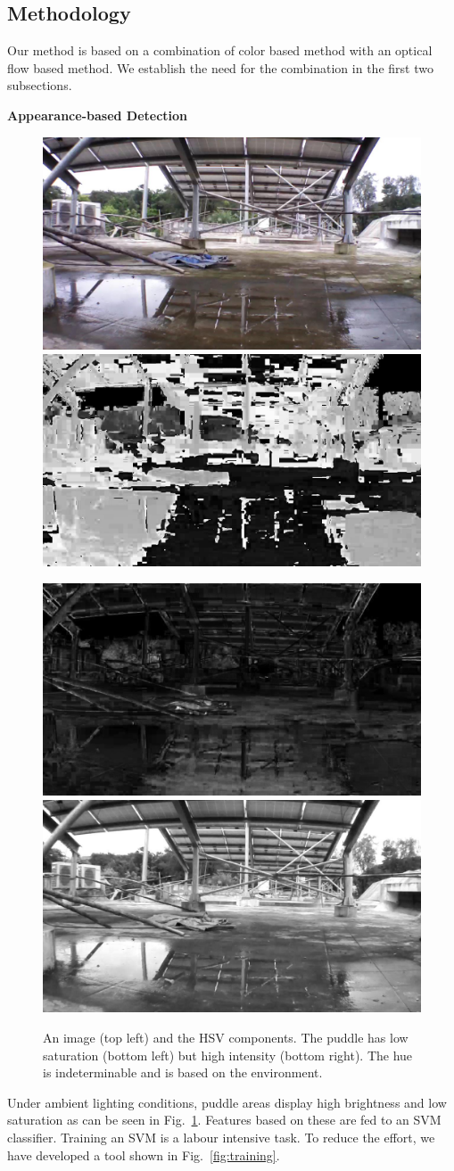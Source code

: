 \documentclass[11pt]{article}
\begin{document}
\subsection{Methodology}
Our method is based on a combination of color based method with an optical flow
based method.  We establish the need for the combination in the first two subsections.

\noindent\textbf{Appearance-based Detection}

\begin{figure}[h!]
  \centering
  \includegraphics[width=0.4\linewidth]{stagnantWater/figures/IMG_PAIR_27_1}
  \hfill
  \includegraphics[width=0.4\linewidth]{stagnantWater/figures/IMG_PAIR_27_1_H} 

  \includegraphics[width=0.4\linewidth]{stagnantWater/figures/IMG_PAIR_27_1_S}
  \hfill
  \includegraphics[width=0.4\linewidth]{stagnantWater/figures/IMG_PAIR_27_1_V}
  \caption{An image (top left) and the HSV components.  The puddle has
    low saturation (bottom left) but high intensity (bottom right).
    The hue is indeterminable and is based on the environment.}
  \label{fig:HSV}
\end{figure}

Under ambient lighting conditions, puddle areas display high
brightness and low saturation as can be seen in
Fig.~\ref{fig:HSV}. Features based on these are fed to an SVM
classifier. Training an SVM is a labour intensive task.  To reduce the
effort, we have developed a tool shown in Fig.~\ref{fig:training}. 
\end{document}

